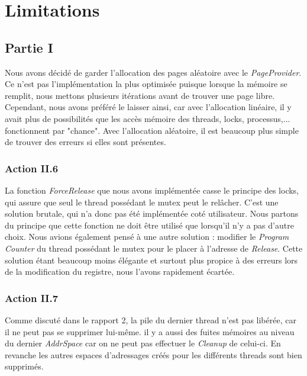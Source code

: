 \documentclass{article}
\begin{document}
\section{Limitations}
\subsection{Partie I}
Nous avons décidé de garder l'allocation des pages aléatoire avec le \textit{PageProvider}. Ce n'est pas
l'implémentation la plus optimisée puisque lorsque la mémoire se remplit, nous mettons plusieurs itérations avant
de trouver une page libre. Cependant, nous avons préféré le laisser ainsi, car avec l'allocation linéaire, il y avait
plus de possibilités que les accès mémoire des threads, locks, processus,... fonctionnent par "chance". Avec l'allocation
aléatoire, il est beaucoup plus simple de trouver des erreurs si elles sont présentes.

\subsubsection{Action II.6}
La fonction \textit{ForceRelease} que nous avons implémentée casse le principe des locks, qui assure que seul le thread possédant le mutex peut le relâcher.
C'est une solution brutale, qui n'a donc pas été implémentée coté utilisateur. Nous partons du principe que cette fonction ne doit être utilisé que
lorsqu'il n'y a pas d'autre choix. Nous avions également pensé à une autre solution : modifier le \textit{Program Counter} du thread possédant
le mutex pour le placer à l'adresse de \textit{Release}. Cette solution étant beaucoup moins élégante et surtout plus propice à des erreurs lors de la
modification du registre, nous l'avons rapidement écartée.

\subsubsection{Action II.7}
Comme discuté dans le rapport 2, la pile du dernier thread n'est pas libérée, car il ne peut pas se supprimer lui-même. il y a aussi des fuites mémoires au niveau
du dernier \textit{AddrSpace} car on ne peut pas effectuer le \textit{Cleanup} de celui-ci. En revanche les autres espaces d'adressages créés pour les différents
threads sont bien supprimés.
\end{document}
